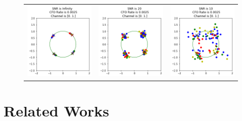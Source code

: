 \begin{figure}
\begin{tabular}{ccc}
    \includegraphics[width=45mm]{figures/cfo_equal_intro/snr_0_c5/cfo_0.png}&
    \includegraphics[width=45mm]{figures/cfo_equal_intro/snr_20_c5/cfo_0.png}&
    \includegraphics[width=45mm]{figures/cfo_equal_intro/snr_10_c5/cfo_0.png}\\
  \end{tabular}
  \label{fig:multi_tap_cfo}
\end{figure}

\section{Related Works}

